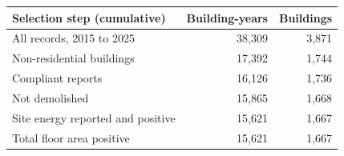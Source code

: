 \begin{tabular}{lrr}
\toprule
Selection step (cumulative) & Building-years & Buildings \\
\midrule
All records, 2015 to 2025 & 38,309 & 3,871 \\
Non-residential buildings & 17,392 & 1,744 \\
Compliant reports & 16,126 & 1,736 \\
Not demolished & 15,865 & 1,668 \\
Site energy reported and positive & 15,621 & 1,667 \\
Total floor area positive & 15,621 & 1,667 \\
\bottomrule
\end{tabular}

